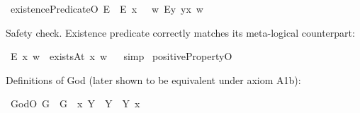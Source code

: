 %
\begin{isabellebody}%
%
%
\isadelimtheory
%
\endisadelimtheory
%
\isatagtheory
%
\endisatagtheory
{\isafoldtheory}%
%
\isadelimtheory
%
\endisadelimtheory
%
\isamarkuptrue%
%
\isamarkuptrue%
\isamarkupfalse%
\ existencePredicate{\isacharcolon}{\isacharcolon}{\isachardoublequoteopen}{\isasymup}{\isasymlangle}O{\isasymrangle}{\isachardoublequoteclose}\ {\isacharparenleft}{\isachardoublequoteopen}E{\isacharbang}{\isachardoublequoteclose}{\isacharparenright}\ \ {\isachardoublequoteopen}E{\isacharbang}\ x\ \ {\isasymequiv}\ {\isasymlambda}w{\isachardot}\ {\isacharparenleft}\isactrlbold {\isasymexists}\isactrlsup Ey{\isachardot}\ y\isactrlbold {\isasymapprox}x{\isacharparenright}\ w{\isachardoublequoteclose}%
\begin{isamarkuptext}%
Safety check. Existence predicate correctly matches its meta-logical counterpart:%
\end{isamarkuptext}\isamarkuptrue%
\isamarkupfalse%
\ {\isachardoublequoteopen}E{\isacharbang}\ x\ w\ {\isasymlongleftrightarrow}\ existsAt\ x\ w{\isachardoublequoteclose}%
\isadelimproof
\ %
\endisadelimproof
%
\isatagproof
{}\isamarkupfalse%
\ simp%
\endisatagproof
{\isafoldproof}%
%
\isadelimproof
%
\endisadelimproof
\isanewline
\isanewline
{}\isamarkupfalse%
\ positiveProperty{\isacharcolon}{\isacharcolon}{\isachardoublequoteopen}{\isasymup}{\isasymlangle}{\isasymup}{\isasymlangle}O{\isasymrangle}{\isasymrangle}{\isachardoublequoteclose}\ {\isacharparenleft}{\isachardoublequoteopen}{\isasymP}{\isachardoublequoteclose}{\isacharparenright}\ %
%
\begin{isamarkuptext}%
Definitions of God (later shown to be equivalent under axiom A1b):%
\end{isamarkuptext}\isamarkuptrue%
\isamarkupfalse%
\ God{\isacharcolon}{\isacharcolon}{\isachardoublequoteopen}{\isasymup}{\isasymlangle}O{\isasymrangle}{\isachardoublequoteclose}\ {\isacharparenleft}{\isachardoublequoteopen}G{\isachardoublequoteclose}{\isacharparenright}\ \ {\isachardoublequoteopen}G\ {\isasymequiv}\ {\isacharparenleft}{\isasymlambda}x{\isachardot}\ \isactrlbold {\isasymforall}Y{\isachardot}\ {\isasymP}\ Y\ \isactrlbold {\isasymrightarrow}\ Y\ x{\isacharparenright}{\isachardoublequoteclose}\isanewline

\end{isabellebody}

